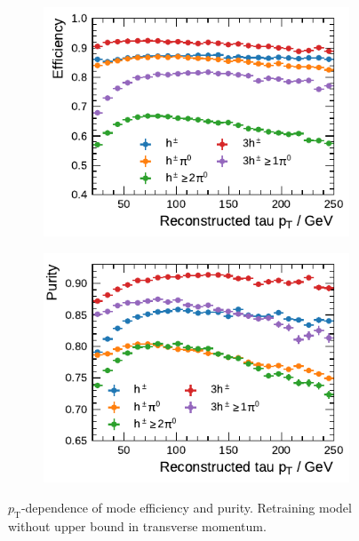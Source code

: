 \begin{figure}[htb]
  \begin{subfigure}{0.48\textwidth}
    \centering
    \includegraphics{./figures/decay_mode_classification/highpt/efficiency_profile.pdf}
  \end{subfigure}\hfill
  \begin{subfigure}{0.48\textwidth}
    \centering
    \includegraphics{./figures/decay_mode_classification/highpt/purity_profile.pdf}
  \end{subfigure}
  \caption{$p_\text{T}$-dependence of mode efficiency and purity. Retraining
    model without upper bound in transverse momentum.}
  \label{fig:mode_efficiency_purity_highpt}
\end{figure}


